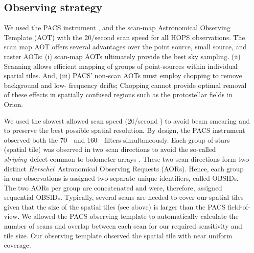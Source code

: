 \documentclass[manuscript]{aastex61}
\newcommand{\herschel}{{\em Herschel}}
\begin{document}
\subsection{Observing strategy}
\label{sec:obs}
\par
We used the PACS instrument \citep{pacs}, and the scan-map Astronomical Observing Template (AOT) with the 20\arcsec/second scan speed for all HOPS observations.  The scan map AOT offers several advantages over the point source, small source, and raster AOTs: (i) scan-map AOTs ultimately provide the best sky sampling.  (ii) Scanning allows efficient mapping of groups of point-sources within individual spatial tiles.  And, (iii) PACS' non-scan AOTs must employ chopping to remove background and low- frequency drifts; Chopping cannot provide optimal removal of these effects in spatially confused regions such as the protostellar fields in Orion.

\par
We used the slowest allowed scan speed (20\arcsec/second ) to avoid beam smearing and to preserve the best possible spatial resolution.   By design, the PACS instrument observed both the 70~\micron\ and 160~\micron\ filters simultaneously.  Each group of stars (spatial tile) was observed in two scan directions to avoid the so-called {\em striping}\ defect common to bolometer arrays \citep{boloref}.  These two scan directions form two distinct \herschel\ Astronomical Observing Requests (AORs).  Hence, each group in our observations is assigned two separate unique identifiers, called OBSIDs.  The two AORs per group are concatenated and were, therefore, assigned sequential OBSIDs.  Typically, several scans are needed to cover our spatial tiles given that the size of the spatial tiles (see above) is larger than the PACS field-of-view.  We allowed the PACS observing template to automatically calculate the number of scans and overlap between each scan for our required sensitivity and tile size.  Our observing template observed the spatial tile with near uniform coverage.
\end{document}
